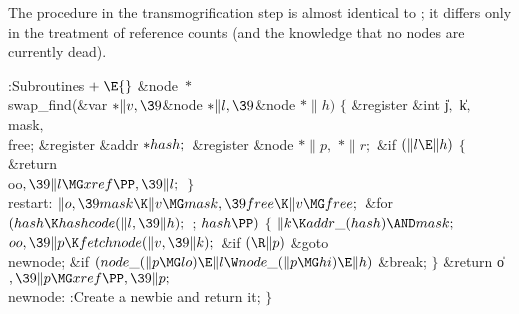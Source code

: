 The  procedure in the transmogrification step is
almost identical to ; it differs only in the treatment
of reference counts (and the knowledge that no nodes are currently dead).

\Y\B\4:Subroutines\X${}\mathrel+\E{}$\6
\&{node} ${}{*}{}$\\{swap\_find}(\&{var} ${}{*}\|v,\39{}$\&{node} ${}{*}\|l,%
\39{}$\&{node} ${}{*}\|h){}$\1\1\2\2\6
${}\{{}$\1\6
\&{register} \&{int} \|j${},{}$ \|k${},{}$ \\{mask}${},{}$ \\{free};\6
\&{register} \&{addr} ${}{*}\\{hash};{}$\6
\&{register} \&{node} ${}{*}\|p,{}$ ${}{*}\|r;{}$\7
\&{if} ${}(\|l\E\|h){}$\5
${}\{{}$\1\6
\&{return} \\{oo}${},\39\|l\MG\\{xref}\PP,\39\|l;{}$\6
\4${}\}{}$\2\6
\4\\{restart}:\5
${}\|o,\39\\{mask}\K\|v\MG\\{mask},\39\\{free}\K\|v\MG\\{free};{}$\6
\&{for} ${}(\\{hash}\K\\{hashcode}(\|l,\39\|h);{}$  ; ${}\\{hash}\PP){}$\5
${}\{{}$\1\6
${}\|k\K\\{addr\_}(\\{hash})\AND\\{mask};{}$\6
${}\\{oo},\39\|p\K\\{fetchnode}(\|v,\39\|k);{}$\6
\&{if} ${}(\R\|p){}$\1\5
\&{goto} \\{newnode};\2\6
\&{if} ${}(\\{node\_}(\|p\MG\\{lo})\E\|l\W\\{node\_}(\|p\MG\\{hi})\E\|h){}$\1\5
\&{break};\2\6
\4${}\}{}$\2\6
\&{return} \|o${},\39\|p\MG\\{xref}\PP,\39\|p;{}$\6
\4\\{newnode}:\5
:Create a newbie and return it\X;\6
\4${}\}{}$\2\par
\fi


